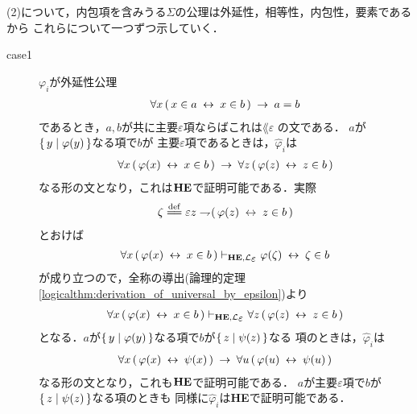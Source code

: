 \begin{metaprf}
		(2)について，内包項を含みうる$\Sigma$の公理は外延性，相等性，内包性，要素であるから
		これらについて一つずつ示していく．
		\begin{description}
			\item[case1] $\varphi_{i}$が外延性公理
				\begin{align}
					\forall x\, (\, x \in a \hspace{0.25em}\leftrightarrow\hspace{0.25em} x \in b\, ) \hspace{0.25em}\rightarrow\hspace{0.25em} a = b
				\end{align}
				であるとき，$a,b$が共に主要$\varepsilon$項ならばこれは$\lang{\varepsilon}$
				の文である．
				$a$が$\{\, y \mid \varphi(y)\, \}$なる項で$b$が
				主要$\varepsilon$項であるときは，$\hat{\varphi}_{i}$は
				\begin{align}
					\forall x\, (\, \varphi(x) \hspace{0.25em}\leftrightarrow\hspace{0.25em} x \in b\, ) \hspace{0.25em}\rightarrow\hspace{0.25em} 
					\forall z\, (\, \varphi(z) \hspace{0.25em}\leftrightarrow\hspace{0.25em} z \in b\, )
				\end{align}
				なる形の文となり，これは${\bf HE}$で証明可能である．実際
				\begin{align}
					\zeta \defeq \varepsilon z \negation (\, \varphi(z) \lrarrow z \in b\, )
				\end{align}
				とおけば
				\begin{align}
					\forall x\, (\, \varphi(x) \lrarrow x \in b\, ) 
					\provable{\mbox{{\bf HE}},\lang{\varepsilon}} \varphi(\zeta) \lrarrow \zeta \in b
				\end{align}
				が成り立つので，全称の導出(論理的定理\ref{logicalthm:derivation_of_universal_by_epsilon})より
				\begin{align}
					\forall x\, (\, \varphi(x) \lrarrow x \in b\, ) 
					\provable{\mbox{{\bf HE}},\lang{\varepsilon}}
					\forall z\, (\, \varphi(z) \lrarrow z \in b\, )
				\end{align}
				となる．$a$が$\{\, y \mid \varphi(y)\, \}$なる項で$b$が$\{\, z \mid \psi(z)\, \}$なる
				項のときは，$\hat{\varphi}_{i}$は
				\begin{align}
					\forall x\, (\, \varphi(x) \hspace{0.25em}\leftrightarrow\hspace{0.25em} \psi(x)\, ) \hspace{0.25em}\rightarrow\hspace{0.25em} 
					\forall u\, (\, \varphi(u) \hspace{0.25em}\leftrightarrow\hspace{0.25em} \psi(u)\, )
				\end{align}
				なる形の文となり，これも${\bf HE}$で証明可能である．
				$a$が主要$\varepsilon$項で$b$が$\{\, z \mid \psi(z)\, \}$なる項のときも
				同様に$\hat{\varphi}_{i}$は{\bf HE}で証明可能である．
			

\end{description}
\end{metaprf}
